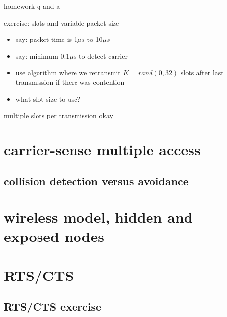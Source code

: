\begin{frame}{homework q-and-a}
\end{frame}

\begin{frame}[label=slotEx]{exercise: slots and variable packet size}
    \begin{itemize}
    \item say: packet time is 1$\mu s$ to 10$\mu s$
    \item say: minimum 0.1$\mu s$ to detect carrier
    \item use algorithm where we retransmit $K=rand(0, 32)$ slots after last transmission if there was contention
    \item what slot size to use?
    \end{itemize}
\end{frame}

\begin{frame}{multiple slots per transmission okay}
\end{frame}

\section{carrier-sense multiple access}



\subsection{collision detection versus avoidance}



\section{wireless model, hidden and exposed nodes} 


\section{RTS/CTS}


\subsection{RTS/CTS exercise}


